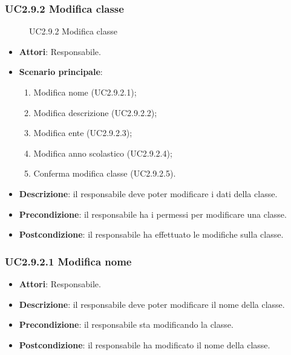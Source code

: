 \subsubsection{UC2.9.2 Modifica classe}
\begin{figure}[H]
\centering
\noindent{}
\caption{UC2.9.2 Modifica classe}
\end{figure}
\begin{itemize}
\item \textbf{Attori}: Responsabile.
\item \textbf{Scenario principale}:
\begin{enumerate}
\item Modifica nome (UC2.9.2.1);
\item Modifica descrizione (UC2.9.2.2);
\item Modifica ente (UC2.9.2.3);
\item Modifica anno scolastico (UC2.9.2.4);
\item Conferma modifica classe (UC2.9.2.5).
\end{enumerate}
\item \textbf{Descrizione}: il responsabile deve poter modificare i dati della classe.
\item \textbf{Precondizione}: il responsabile ha i permessi per modificare una classe.
\item \textbf{Postcondizione}: il responsabile ha effettuato le modifiche sulla classe.
\end{itemize}
\subsubsection{UC2.9.2.1 Modifica nome}
\begin{itemize}
\item \textbf{Attori}: Responsabile.
\item \textbf{Descrizione}: il responsabile deve poter modificare il nome della classe.
\item \textbf{Precondizione}: il responsabile sta modificando la classe.
\item \textbf{Postcondizione}: il responsabile ha modificato il nome della classe.
\end{itemize}
